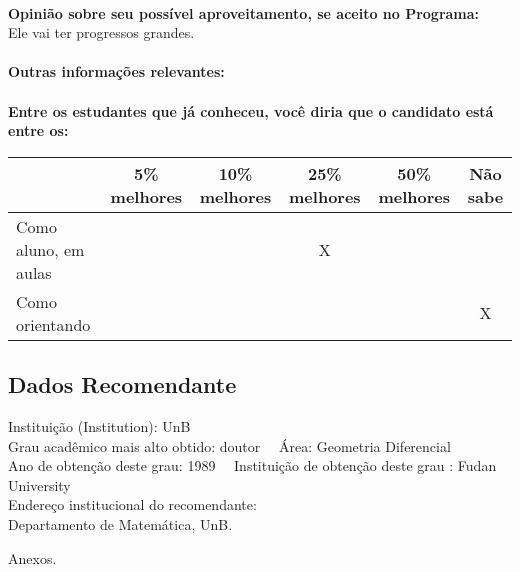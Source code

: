 \documentclass[11pt]{article}
\begin{document}
\\
\textbf{Opinião sobre seu possível aproveitamento, se aceito no Programa:}
\\Ele vai ter progressos grandes.\\ 
\\
\textbf{Outras informações relevantes:} \\
\\[0.3cm]
\textbf{Entre os estudantes que já conheceu, você diria que o candidato está entre os:}
\\
\begin{tabular}{|l|c|c|c|c|c|}
\hline
 & 5\% melhores & 10\% melhores & 25\% melhores & 50\% melhores & Não sabe \\
\hline
Como aluno, em aulas &  &  & X &  & \\
\hline
Como orientando &  &  &  &  & X\\
\hline
\end{tabular}
\subsection*{Dados Recomendante} 
	Instituição (Institution): UnB
\\ 
	Grau acadêmico mais alto obtido: doutor
	\ \ Área: Geometria Diferencial
	\\
	Ano de obtenção deste grau: 1989
	\ \ 
	Instituição de obtenção deste grau : Fudan University
	\\ 
	Endereço institucional do recomendante: \\ Departamento de Matemática, UnB. 
\begin{center}
Anexos.
\end{center}
\end{document}

